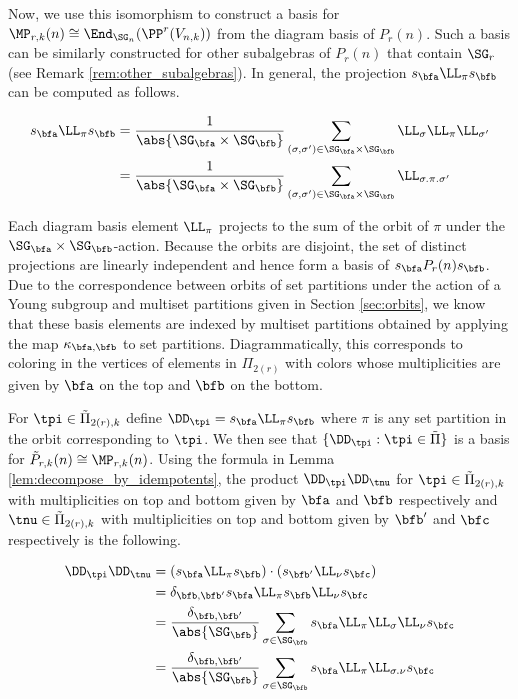 Now, we use this isomorphism to construct a basis for $\MP_{r,k}(n)\cong\End_{\SG_n}(\PP^r(V_{n,k}))$ from the diagram basis of $P_r(n)$. Such a basis can be similarly constructed for other subalgebras of $P_r(n)$ that contain $\SG_r$ (see Remark \ref{rem:other_subalgebras}). In general, the projection $s_\bfa \LL_\pi s_\bfb$ can be computed as follows.

\begin{align*}
    s_\bfa\LL_\pi s_\bfb&=\frac{1}{\abs{\SG_\bfa\times\SG_\bfb}}\sum_{(\sigma,\sigma')\in \SG_\bfa\times\SG_\bfb} \LL_\sigma\LL_\pi\LL_{\sigma'}\\
    &=\frac{1}{\abs{\SG_\bfa\times\SG_\bfb}}\sum_{(\sigma,\sigma')\in \SG_\bfa\times\SG_\bfb} \LL_{\sigma.\pi.\sigma'}
\end{align*}

Each diagram basis element $\LL_\pi$ projects to the sum of the orbit of $\pi$ under the $\SG_\bfa\times\SG_{\bfb}$-action. Because the orbits are disjoint, the set of distinct projections are linearly independent and hence form a basis of $s_\bfa P_r(n) s_\bfb$. Due to the correspondence between orbits of set partitions under the action of a Young subgroup and multiset partitions given in Section \ref{sec:orbits}, we know that these basis elements are indexed by multiset partitions obtained by applying the map $\kappa_{\bfa,\bfb}$ to set partitions. Diagrammatically, this corresponds to coloring in the vertices of elements in $\Pi_{2(r)}$ with colors whose multiplicities are given by $\bfa$ on the top and $\bfb$ on the bottom.

For $\tpi\in\tilde\Pi_{2(r),k}$ define $\DD_\tpi=s_\bfa\LL_\pi s_\bfb$ where $\pi$ is any set partition in the orbit corresponding to $\tpi$. We then see that $\{\DD_\tpi:\tpi\in\tilde\Pi\}$ is a basis for $\tilde{P}_{r,k}(n)\cong \MP_{r,k}(n)$. Using the formula in Lemma \ref{lem:decompose_by_idempotents}, the product $\DD_\tpi\DD_\tnu$ for $\tpi\in\tilde\Pi_{2(r),k}$ with multiplicities on top and bottom given by $\bfa$ and $\bfb$ respectively and $\tnu\in\tilde\Pi_{2(r),k}$ with multiplicities on top and bottom given by $\bfb'$ and $\bfc$ respectively is the following.

\begin{align*}
    \DD_\tpi\DD_\tnu&=(s_\bfa\LL_\pi s_\bfb)\cdot(s_{\bfb'}\LL_\nu s_\bfc)\\
    &=\delta_{\bfb,\bfb'}s_\bfa\LL_\pi s_\bfb \LL_\nu s_\bfc\\
    &=\frac{\delta_{\bfb,\bfb'}}{\abs{\SG_\bfb}}\sum_{\sigma\in\SG_\bfb}s_\bfa\LL_\pi\LL_\sigma\LL_\nu s_\bfc\\
    &=\frac{\delta_{\bfb,\bfb'}}{\abs{\SG_\bfb}}\sum_{\sigma\in\SG_\bfb}s_\bfa\LL_\pi\LL_{
    \sigma.\nu} s_\bfc
\end{align*}

